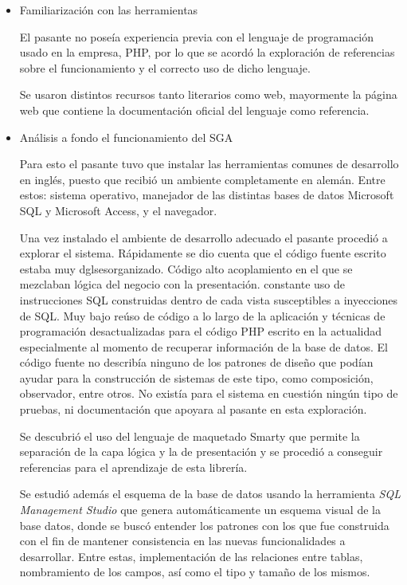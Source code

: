 \begin{itemize}
\item Familiarización con las herramientas

El pasante no poseía experiencia previa con el lenguaje de programación usado en la empresa, PHP, por lo que se acordó la exploración de referencias sobre el funcionamiento y el correcto uso de dicho lenguaje.

Se usaron distintos recursos tanto literarios como web, mayormente la página web que contiene la documentación oficial del lenguaje como referencia. \cite{bib:php}

\item Análisis a fondo el funcionamiento del SGA

Para esto el pasante tuvo que instalar las herramientas comunes de desarrollo en inglés, puesto que recibió un ambiente completamente en alemán. Entre estos: sistema operativo, manejador de las distintas bases de datos Microsoft SQL y Microsoft Access, y el navegador.

Una vez instalado el ambiente de desarrollo adecuado el pasante procedió a explorar el sistema. Rápidamente se dio cuenta que el código fuente escrito estaba muy dglsesorganizado. Código alto acoplamiento en el que se mezclaban lógica del negocio con la presentación. constante uso de instrucciones \gls{SQL} construidas dentro de cada vista susceptibles a inyecciones de \gls{SQL}. Muy bajo reúso de código a lo largo de la aplicación y técnicas de programación desactualizadas para el código PHP escrito en la actualidad especialmente al momento de recuperar información de la base de datos. El código fuente no describía ninguno de los patrones de diseño que podían ayudar para la construcción de sistemas de este tipo, como composición, observador, entre otros. No existía para el sistema en cuestión ningún tipo de pruebas, ni documentación que apoyara al pasante en esta exploración.

Se descubrió el uso del lenguaje de maquetado Smarty que permite la separación de la capa lógica y la de presentación y se procedió a conseguir referencias para el aprendizaje de esta librería.

Se estudió además el esquema de la base de datos usando la herramienta \emph{SQL Management Studio} que genera automáticamente un esquema visual de la base datos, donde se buscó entender los patrones con los que fue construida con el fin de mantener consistencia en las nuevas funcionalidades a desarrollar. Entre estas, implementación de las relaciones entre tablas, nombramiento de los campos, así como el tipo y tamaño de los mismos.


\end{itemize}
